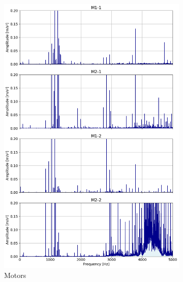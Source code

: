 \documentclass{llncs}
\begin{document}
\begin{figure}
\begin{subfigure}[b]{0.3\textwidth}
         \includegraphics[width=\textwidth]{fig/spectrum/motor-wideband.png}
         \caption{Motors}
         \label{fig:motor-wideband}
     \end{subfigure}
     \hfill
     \begin{subfigure}[b]{0.3\textwidth}
         \centering

\end{subfigure}
\end{figure}
\end{document}
